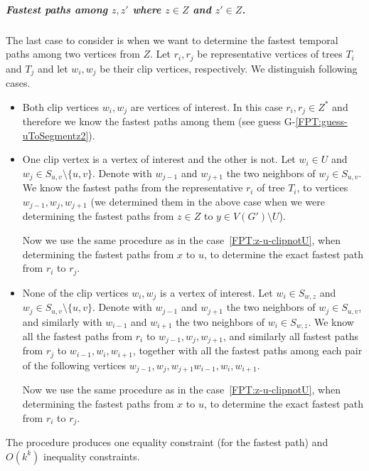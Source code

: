 \documentclass[a4paper,UKenglish,cleveref, autoref, thm-restate]{lipics-v2021}
\begin{document}
\subparagraph{\boldmath Fastest paths among $z,z'$ where $z \in Z$ and $z' \in Z$.}
The last case to consider is when we want to determine the fastest temporal paths among two vertices from $Z$.
Let $r_i, r_j$ be representative vertices of trees $T_i$ and $T_j$ and let $w_i, w_j$ be their clip vertices, respectively.
We distinguish following cases.
\begin{itemize}
    \item  Both clip vertices $w_i,w_j$ are vertices of interest.
    In this case $r_i, r_j \in Z^*$
    and therefore we know the fastest paths among them (see guess G-\ref{FPT:guess-uToSegmentz2}).
    \item One clip vertex is a vertex of interest and the other is not.
    Let $w_i \in U$ and $w_j \in S_{u,v} \setminus \{u,v\}$.
    Denote with $w_{j-1}$ and $w_{j+1}$ the two neighbors of $w_j \in S_{u,v}$.
    We know the fastest paths from the representative $r_i$ of tree $T_i$,
    to vertices $w_{j-1},w_j,w_{j+1}$ 
    (we determined them in the above case 
    when we were determining the fastest paths from $z \in Z$ to $y \in V(G')\setminus U$).
    
    Now we use the same procedure as in
    the case~\ref{FPT:z-u-clipnotU}, when determining the fastest paths from $x$ to $u$,
    to determine the exact fastest path from $r_i$ to $r_j$.
    \item None of the clip vertices $w_i, w_j$ is a vertex of interest.
    Let $w_i \in S_{w,z}$ and $w_j \in S_{u,v} \setminus \{u,v\}$.
    Denote with $w_{j-1}$ and $w_{j+1}$ the two neighbors of $w_j \in S_{u,v}$,
    and 
    similarly with 
    $w_{i-1}$ and $w_{i+1}$ the two neighbors of $w_i \in S_{w,z}$.
    We know all the fastest paths from
    $r_i$ to $w_{j-1},w_j,w_{j+1}$,
    and similarly all fastest paths 
    from $r_j$ to $w_{i-1},w_i,w_{i+1}$,
    together with all the fastest paths among 
    each pair of the following vertices
    $w_{j-1},w_j,w_{j+1} w_{i-1},w_i,w_{i+1}$.
    
    Now we use the same procedure as in
    the case~\ref{FPT:z-u-clipnotU}, when determining the fastest paths from $x$ to $u$,
    to determine the exact fastest path from $r_i$ to $r_j$.
\end{itemize}
The procedure produces one equality constraint (for the fastest path) and $O(k^k)$ inequality constraints.
\end{document}
